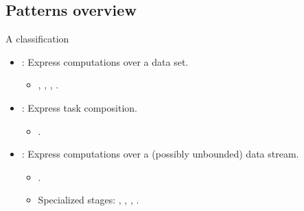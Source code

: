 \subsection{Patterns overview}

\begin{frame}[t]{A classification}
\begin{itemize}
  \item {}: Express computations over a data set.
    \begin{itemize}
      \item {}, , , .
    \end{itemize}

  \vfill\pause
  \item {}: Express task composition.
    \begin{itemize}
      \item {}.
    \end{itemize}

  \vfill\pause
  \item {}: Express computations over a (possibly unbounded) data stream.
    \begin{itemize}
      \item {}.
      \item Specialized stages: , , 
            , .
    \end{itemize}
\end{itemize}
\end{frame}
